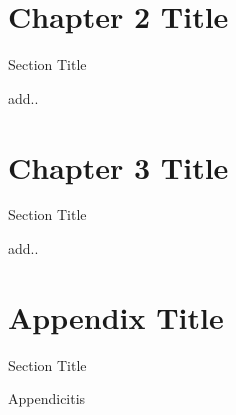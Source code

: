 \documentclass[oneside,12pt,final]{sty/ucthesis-CA2012}
\begin{document}
\begin{mainmatter}
\chapter{Chapter 2 Title}
\begin{section}{Section Title}

add..

\end{section}

\chapter{Chapter 3 Title}
\begin{section}{Section Title}

add..

\end{section}

\appendix

\dsp

\chapter{Appendix Title }{\label{appendix:a}}
\begin{section}{Section Title}

Appendicitis

\end{section}


\end{mainmatter}

\ssp
\newcommand{\newblock}{}


\end{document}
